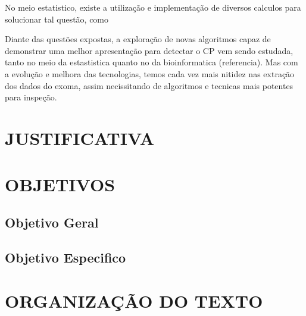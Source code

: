 No meio estatistico, existe a utilização e implementação de diversos calculos para solucionar tal questão, como  

Diante das questões expostas, a exploração de novas algoritmos capaz de demonstrar uma melhor apresentação para detectar o CP vem sendo estudada, tanto no meio da estastistica quanto no da bioinformatica (referencia). Mas com a evolução e melhora das tecnologias, temos cada vez mais nitidez nas extração dos dados do exoma, assim necissitando de algoritmos e tecnicas mais potentes para inspeção.

\section{JUSTIFICATIVA}

\section{OBJETIVOS}

\subsection{Objetivo Geral}

\subsection{Objetivo Especifico}

\section{ORGANIZAÇÃO DO TEXTO}